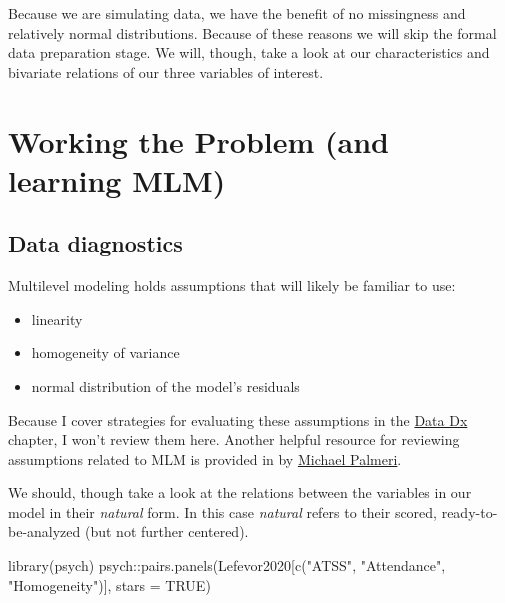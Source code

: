 \documentclass[
  english,
]{book}
\newenvironment{Shaded}{\begin{snugshade}}{\end{snugshade}}
\newcommand{\AttributeTok}[1]{\textcolor[rgb]{0.77,0.63,0.00}{#1}}
\newcommand{\ConstantTok}[1]{\textcolor[rgb]{0.00,0.00,0.00}{#1}}
\newcommand{\FunctionTok}[1]{\textcolor[rgb]{0.00,0.00,0.00}{#1}}
\newcommand{\NormalTok}[1]{#1}
\newcommand{\SpecialCharTok}[1]{\textcolor[rgb]{0.00,0.00,0.00}{#1}}
\newcommand{\StringTok}[1]{\textcolor[rgb]{0.31,0.60,0.02}{#1}}
\providecommand{\tightlist}{%
  \setlength{\itemsep}{0pt}\setlength{\parskip}{0pt}}
\begin{document}
Because we are simulating data, we have the benefit of no missingness and relatively normal distributions. Because of these reasons we will skip the formal data preparation stage. We will, though, take a look at our characteristics and bivariate relations of our three variables of interest.

\hypertarget{working-the-problem-and-learning-mlm}{%
\section{Working the Problem (and learning MLM)}\label{working-the-problem-and-learning-mlm}}

\hypertarget{data-diagnostics}{%
\subsection{Data diagnostics}\label{data-diagnostics}}

Multilevel modeling holds assumptions that will likely be familiar to use:

\begin{itemize}
\tightlist
\item
  linearity
\item
  homogeneity of variance
\item
  normal distribution of the model's residuals
\end{itemize}

Because I cover strategies for evaluating these assumptions in the \href{https://lhbikos.github.io/ReC_MultivModel/DataDx.html}{Data Dx} chapter, I won't review them here. Another helpful resource for reviewing assumptions related to MLM is provided in by \href{https://ademos.people.uic.edu/Chapter18.html\#6_assumptions}{Michael Palmeri}.

We should, though take a look at the relations between the variables in our model in their \emph{natural} form. In this case \emph{natural} refers to their scored, ready-to-be-analyzed (but not further centered).

\begin{Shaded}
\begin{Highlighting}[]
\FunctionTok{library}\NormalTok{(psych)}
\NormalTok{psych}\SpecialCharTok{::}\FunctionTok{pairs.panels}\NormalTok{(Lefevor2020[}\FunctionTok{c}\NormalTok{(}\StringTok{"ATSS"}\NormalTok{, }\StringTok{"Attendance"}\NormalTok{, }\StringTok{"Homogeneity"}\NormalTok{)], }\AttributeTok{stars =} \ConstantTok{TRUE}\NormalTok{)}
\end{Highlighting}
\end{Shaded}
\end{document}

